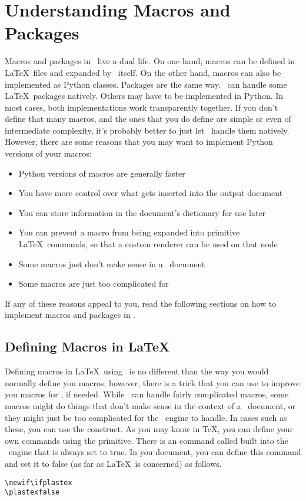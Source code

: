 
\chapter{Understanding Macros and Packages\label{sec:macros}}

Macros and packages in \plasTeX\ live a dual life.  On one hand, macros
can be defined in \LaTeX\ files and expanded by \plasTeX\ itself.  On
the other hand, macros can also be implemented as Python classes.
Packages are the same way.  \plasTeX\ can handle some \LaTeX\ packages
natively.  Others may have to be implemented in Python.  In most
cases, both implementations work transparently together.  If you don't
define that many macros, and the ones that you do define are simple
or even of intermediate complexity, it's probably better to just let
\plasTeX\ handle them natively. However,
there are some reasons that you may want to implement Python versions
of your macros:
\begin{itemize}
\item Python versions of macros are generally faster
\item You have more control over what gets inserted into the output document
\item You can store information in the document's 
    dictionary for use later
\item You can prevent a macro from being expanded into primitive \LaTeX\
    commands, so that a custom renderer can be used on that node
\item Some macros just don't make sense in a \plasTeX\ document
\item Some macros are just too complicated for \plasTeX
\end{itemize}

If any of these reasons appeal to you, read the following sections on
how to implement macros and packages in \plasTeX.


\section{Defining Macros in \LaTeX}

Defining macros in \LaTeX\ using \plasTeX\ is no different than the way
you would normally define you macros; however, there is a trick that you
can use to improve you macros for \plasTeX, if needed.  While \plasTeX\
can handle fairly complicated macros, some macros might do things that
don't make sense in the context of a \plasTeX\ document, or they might
just be too complicated for the \plasTeX\ engine to handle.  In
cases such as these, you can use the  construct.
As you may know in \TeX, you can define your own \macro{if} commands using
the \macro{newif} primitive.  There is an \macro{if} command called
\macro{ifplastex} built into the \plasTeX\ engine that is always set to
true.  In you document, you can define this command and set it to
false (as far as \LaTeX\ is concerned) as follows.
\begin{verbatim}
\newif\ifplastex
\plastexfalse
\end{verbatim}

